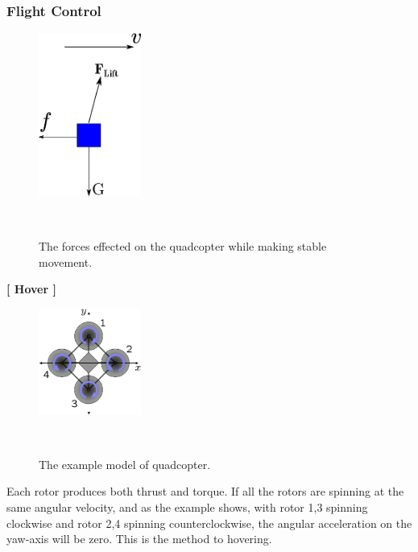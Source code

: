 \subsubsection{Flight Control}
\begin{figure}[h!]
  
  \centering
    \includegraphics[width=0.3\textwidth]{./Pictures/flying.eps}
    \caption{The forces effected on the quadcopter while making stable movement.}\\
\end{figure}
\textbf{[ Hover ]}
\begin{figure}[H]
  
  \centering
    \includegraphics[width=0.3\textwidth]{./Pictures/Quadrotor_yaw_torque.png}
    \caption{The example model of quadcopter.}\\
\end{figure}


Each rotor produces both thrust and torque. If all the rotors are spinning at the same angular velocity, and as the example shows, with rotor 1,3 spinning clockwise and rotor 2,4 spinning counterclockwise, the angular acceleration on the yaw-axis will be zero. 
This is the method to hovering.

